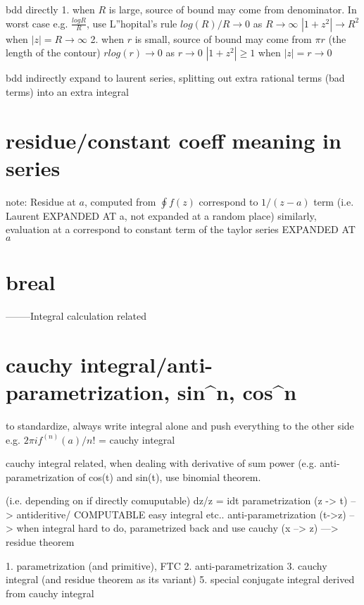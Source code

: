 {{bdd directly
	1. when $R$ is large, source of bound may come from denominator. In worst case e.g. $\frac{logR}{R}$, use L''hopital's rule
    	$log(R)/R \to 0$ as $R \to \infty$
    	$|1+z^2| \to R^2$ when $|z| = R \to \infty$
	2. when $r$ is small, source of bound may come from $\pi r$ (the length of the contour)
    	$rlog(r) \to 0$ as $r \to 0$ 
    	$|1+z^2| \geq 1$ when $|z| = r \to 0$

bdd indirectly
	expand to laurent series, splitting out extra rational terms (bad terms) into an extra integral






\section*{residue/constant coeff meaning in series}
note: Residue at $a$, computed from $\oint f(z)$ correspond to $1/(z-a)$ term (i.e. Laurent EXPANDED AT a, not expanded at a random place)
similarly, evaluation at a correspond to constant term of the taylor series EXPANDED AT $a$


\section*{breal}





--------Integral calculation related
\section*{cauchy integral/anti-parametrization, sin^n, cos^n}
to standardize, always write integral alone and push everything to the other side
e.g. $2\pi if^{(n)}(a)/n!$ = cauchy integral

cauchy integral related, when dealing with derivative of sum power (e.g. anti-parametrization of cos(t) and sin(t), use binomial theorem.


(i.e. depending on if directly comuputable)
dz/z = idt
parametrization (z -> t) --> antideritive/ COMPUTABLE easy integral etc..
anti-parametrization (t->z) --> when integral hard to do, parametrized back and use cauchy
(x --> z) ---> residue theorem


1. parametrization (and primitive), FTC
2. anti-parametrization
3. cauchy integral (and residue theorem as its variant)
5. special conjugate integral derived from cauchy integral



}}
